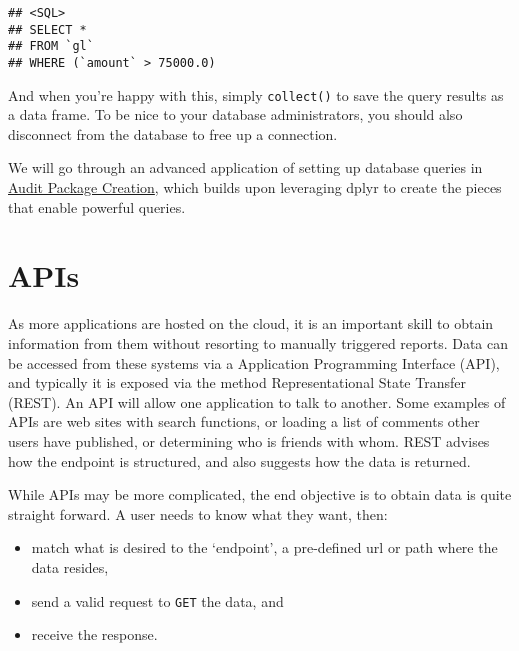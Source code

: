 \documentclass[
]{book}
\newenvironment{Shaded}{\begin{snugshade}}{\end{snugshade}}
\newcommand{\KeywordTok}[1]{\textcolor[rgb]{0.13,0.29,0.53}{\textbf{#1}}}
\newcommand{\NormalTok}[1]{#1}
\newcommand{\OperatorTok}[1]{\textcolor[rgb]{0.81,0.36,0.00}{\textbf{#1}}}
\newcommand{\StringTok}[1]{\textcolor[rgb]{0.31,0.60,0.02}{#1}}
\providecommand{\tightlist}{%
  \setlength{\itemsep}{0pt}\setlength{\parskip}{0pt}}
\begin{document}
\begin{verbatim}
## <SQL>
## SELECT *
## FROM `gl`
## WHERE (`amount` > 75000.0)
\end{verbatim}

And when you're happy with this, simply \texttt{collect()} to save the query results as a data frame. To be nice to your database administrators, you should also disconnect from the database to free up a connection.

\begin{Shaded}
\end{Shaded}

We will go through an advanced application of setting up database queries in \protect\hyperlink{auditpackage}{Audit Package Creation}, which builds upon leveraging dplyr to create the pieces that enable powerful queries.

\hypertarget{apis}{%
\section{APIs}\label{apis}}

As more applications are hosted on the cloud, it is an important skill to obtain information from them without resorting to manually triggered reports. Data can be accessed from these systems via a Application Programming Interface (API), and typically it is exposed via the method Representational State Transfer (REST). An API will allow one application to talk to another. Some examples of APIs are web sites with search functions, or loading a list of comments other users have published, or determining who is friends with whom. REST advises how the endpoint is structured, and also suggests how the data is returned.

While APIs may be more complicated, the end objective is to obtain data is quite straight forward. A user needs to know what they want, then:

\begin{itemize}
\tightlist
\item
  match what is desired to the `endpoint', a pre-defined url or path where the data resides,
\item
  send a valid request to \texttt{GET} the data, and
\item
  receive the response.
\end{itemize}
\end{document}
